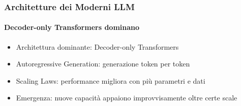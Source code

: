 %
\begin{frame}[t,fragile] \frametitle{Architetture dei Moderni LLM}
	{\scriptsize
		\onslide<1->
            \framesubtitle{Decoder-only Transformers dominano}
            \vspace*{-10pt}
	    	\begin{minipage}[t]{\textwidth}
				\begin{minipage}[t]{0.6\textwidth}
	    			\begin{itemize}[leftmargin=10pt,align=right]
						\onslide<2->\item[\alert{\faHandORight}] \alert{Architettura dominante:} Decoder-only Transformers
						\onslide<3->\item[\alert{\faHandORight}] \alert{Autoregressive Generation:} generazione token per token
						\onslide<4->\item[\alert{\faHandORight}] \alert{Scaling Laws:} performance migliora con più parametri e dati
						\onslide<5->\item[\alert{\faHandORight}] \alert{Emergenza:} nuove capacità appaiono improvvisamente oltre certe scale
					\end{itemize}
            	\end{minipage}
	    	\end{minipage}
	}
\end{frame}
%
